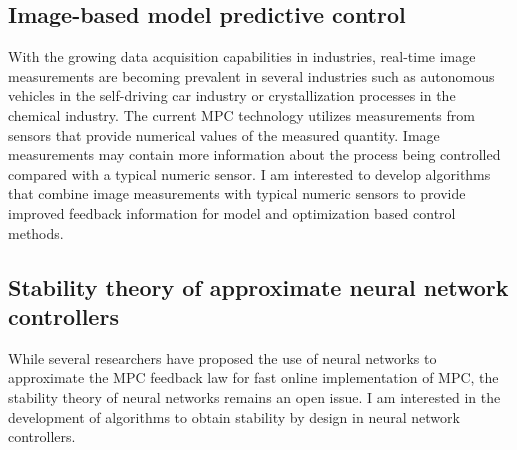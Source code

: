 \documentclass[11pt, a4paper]{article} %
\begin{document}
\subsection*{Image-based model predictive control}

With the growing data acquisition capabilities in industries, real-time image 
measurements are becoming prevalent in several industries such as autonomous 
vehicles in the self-driving car industry or crystallization processes in the 
chemical industry. The current MPC technology utilizes measurements from 
sensors that provide numerical values of the measured quantity. Image 
measurements may contain more information about the process being controlled 
compared with a typical numeric sensor. I am interested to develop algorithms 
that combine image measurements with typical numeric sensors to provide 
improved feedback information for model and optimization based control methods.

%

\subsection*{Stability theory of approximate neural network controllers}

While several researchers have proposed the use of neural networks to 
approximate the MPC feedback law for fast online implementation of MPC, the 
stability theory of neural networks remains an open issue. I am interested in 
the development of algorithms to obtain stability by design in neural network 
controllers. 
\end{document}
